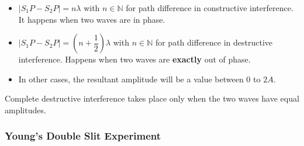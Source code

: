 \begin{itemize}
  \item $|S_1P-S_2P|=n\lambda$ with $n\in\mathbb{N}$ for path difference in constructive interference. It happens when two waves are in phase.
  \item $|S_1P-S_2P|=\left(n+\dfrac{1}{2}\right)\lambda$ with $n\in\mathbb{N}$ for path difference in destructive interference. Happens when two waves are \textbf{exactly} out of phase.
  \item In other cases, the resultant amplitude will be a value between 0 to $2A$.
\end{itemize}
Complete destructive interference takes place only when the two waves have equal amplitudes.
\subsubsection*{Young's Double Slit Experiment}
